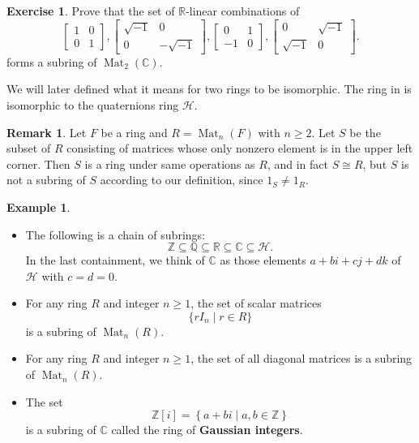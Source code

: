 \documentclass[12pt]{report}
\numberwithin{equation}{section}
\numberwithin{theorem}{chapter}
\theoremstyle{definition}
\newtheorem{example}[theorem]{Example}
\newtheorem{exercise}{Exercise}
\newtheorem*{basic properties}{Basic Properties}
\newtheorem*{Important Remark}{Important Remark}
\newtheorem{remark}[theorem]{Remark}
\newcommand{\df}[1]{{\bf #1}\index{#1}}
\newcommand{\R}{\mathbb{R}}
\newcommand{\Z}{\mathbb{Z}}
\newcommand{\Q}{\mathbb{Q}}
\newcommand{\C}{\mathbb{C}}
\DeclareMathOperator{\Mat}{Mat}
\begin{document}
\begin{exercise}\label{exercise quaternions ring}
Prove that the set of $\R$-linear combinations of 
$$\begin{bmatrix}
1 & 0 \\ 0 & 1
\end{bmatrix},
\begin{bmatrix}
\sqrt{-1} & 0 \\ 0 & -\sqrt{-1} 
\end{bmatrix},
\begin{bmatrix}
0 & 1 \\ -1 & 0 
\end{bmatrix},
\begin{bmatrix}
0 & \sqrt{-1} \\ \sqrt{-1} & 0 
\end{bmatrix}.$$
forms a subring of $\Mat_{2}(\C)$. 
\end{exercise}

We will later defined what it means for two rings to be isomorphic. The ring in  is isomorphic to the quaternions ring $\mathcal{H}$. 


\begin{remark}
Let $F$ be a ring and $R = \Mat_{n}(F)$ with $n \geqslant 2$. Let $S$ be the subset of $R$ consisting of matrices whose only nonzero element is in the upper left corner. Then $S$ is a ring under same operations as $R$, and in fact $S \cong R$, but $S$ is not a subring of $S$ according to our definition, since $1_S \neq 1_R$.
\end{remark}



\begin{example}
\begin{itemize}[itemsep=0.1em]
\item The following is a chain of subrings:
$$\Z \subseteq \Q \subseteq \R \subseteq \C \subseteq \mathcal{H}.$$
In the last containment, we think of $\C$ as those elements $a + bi + cj + dk$ of
  $\mathcal{H}$ with $c=d=0$.
\item For any ring $R$ and integer $n \geqslant 1$, the set of scalar matrices
$$\{ rI_n \mid r \in R \}$$ 
is a subring of $\Mat_{n}(R)$.
 \item For any ring $R$ and integer $n \geqslant 1$, the set of all diagonal matrices is a subring of $\Mat_{n}(R)$. 
\item The set 
$$\Z[i]=\left \{ a+bi\mid a,b \in \Z \right\}$$ 
is a subring of $\C$ called the ring of \df{Gaussian integers}.
\end{itemize}
\end{example}
\end{document}
